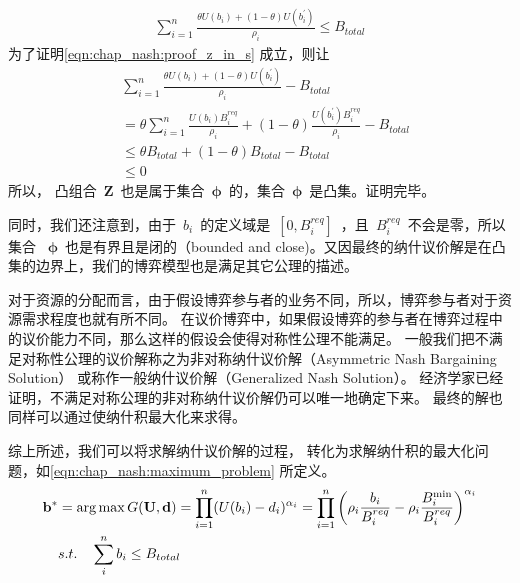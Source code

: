 \begin{align}
    \sum_{i=1}^{n} \frac{ \theta U(b_i) + (1-\theta) U(b_i^\prime)}{\rho_i}  \le B_{total}
    \label{eqn:chap_nash:proof_z_in_s}
\end{align}
为了证明\eqref{eqn:chap_nash:proof_z_in_s} 成立，则让
\begin{align*}
    &\sum_{i=1}^{n} \frac{ \theta U(b_i) + (1-\theta) U(b_i^\prime)}{\rho_i} - B_{total} \\
    &= \theta \sum_{i=1}^n \frac{U(b_i)B_i^{req}}{\rho_i} + (1-\theta) \frac{U(b_i^\prime)B_i^{req}}{\rho_i} -B_{total} \\
    &\le \theta B_{total} + (1-\theta)B_{total} - B_{total}\\
    & \le 0
\end{align*}
所以，
凸组合~$\mathbf{Z}$~也是属于集合~$\mathbf{\phi}$~的，集合~$\mathbf{\phi}$~是凸集。证明完毕。

同时，我们还注意到，由于~$b_i$~的定义域是~$[0,B_i^{req}]$~，且~$B_i^{req}$~不会是零，所以集合
~$\mathbf{\phi}$~也是有界且是闭的（bounded and close)。又因最终的纳什议价解是在凸集的边界上，我们的博弈模型也是满足其它公理的描述。

对于资源的分配而言，由于假设博弈参与者的业务不同，所以，博弈参与者对于资源需求程度也就有所不同。
在议价博弈中，如果假设博弈的参与者在博弈过程中的议价能力不同，那么这样的假设会使得对称性公理不能满足。
一般我们把不满足对称性公理的议价解称之为非对称纳什议价解（Asymmetric Nash Bargaining Solution）
或称作一般纳什议价解（Generalized  Nash  Solution）。
经济学家已经证明，不满足对称公理的非对称纳什议价解仍可以唯一地确定下来\cite{Osborne_Rubinstein_1994}。
最终的解也同样可以通过使纳什积最大化来求得。

综上所述，我们可以将求解纳什议价解的过程，
转化为求解纳什积的最大化问题，如\eqref{eqn:chap_nash:maximum_problem} 所定义。
\begin{align}
    \mathbf{b}^* &= \arg \max G(\mathbf{U}, \mathbf{d}) = \prod_{i=1}^n (U(b_i) - d_i)^{\alpha_i} = \prod_{i=1}^{n} \left(\rho_i \frac{b_i}{B_i^{req}} - \rho_i \frac{B_i^{\min}}{B_i^{req}} \right)^{\alpha_i} \notag\\
    & s.t. \quad \sum_i^n b_i \le B_{total} 
    \label{eqn:chap_nash:maximum_problem}
\end{align}


